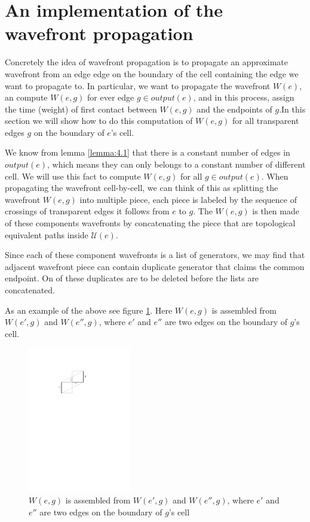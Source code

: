 \section{An implementation of the wavefront propagation} \label{section:implwavefront}

Concretely the idea of wavefront propagation is to propagate an approximate wavefront from an edge edge on 
the boundary of the cell containing the edge we want to propagate to. In particular, we want to propagate 
the wavefront $W(e)$, an compute $W(e,g)$ for ever edge $g \in output(e)$, and in this process, assign the 
time (weight) of first contact between $W(e,g)$ and the endpoints of $g$.In this section we will show how 
to do this computation of $W(e,g)$ for all transparent edges $g$ on the boundary of $e$'s cell. 

We know from lemma \ref{lemma:4.1} that there is a constant number of edges in $output(e)$, which means 
they can only belongs to a constant number of different cell. We will use this fact to compute $W(e,g)$ 
for all $g \in output(e)$. When propagating the wavefront cell-by-cell, we can think of this as splitting 
the wavefront $W(e,g)$ into multiple piece, each piece is labeled by the sequence of crossings of 
transparent edges it follows from $e$ to $g$. The $W(e,g)$ is then made of these components wavefronts by 
concatenating the piece that are topological equivalent paths inside $\mathcal{U}(e)$. 

Since each of these component wavefronts is a list of generators, we may find that adjacent wavefront 
piece can contain duplicate generator that claims the common endpoint. On of these duplicates are to be 
deleted before the lists are concatenated.

As an example of the above see figure \ref{fig:weg}. Here $W(e,g)$ is assembled from $W(e',g)$ and 
$W(e'',g)$, where $e'$ and $e''$ are two edges on the boundary of $g$'s cell.

\begin{figure}[H]
	\centering
	\includegraphics[width=0.4\textwidth]{figures/weg.pdf}
	\caption{$W(e,g)$ is assembled from $W(e',g)$ and $W(e'',g)$, where $e'$ and $e''$ are two edges on 
    		 the boundary of $g$'s cell}
	\label{fig:weg}
\end{figure}

